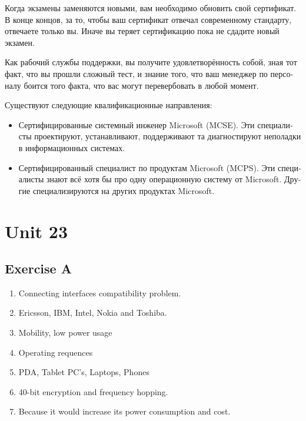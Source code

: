 \documentclass[a5paper,10pt,notitlepage,pdftex,headsepline]{scrartcl}
\begin{document}
\begin{otherlanguage}{russian}
      Когда экзамены заменяются новыми, вам необходимо обновить свой
      сертификат.
      В конце концов, за то, чтобы ваш сертификат отвечал современному
      стандарту, отвечаете только вы.
      Иначе вы теряет сертификацию пока не сдадите новый экзамен.

      Как рабочий службы поддержки, вы получите удовлетворённость собой, зная
      тот факт, что вы прошли сложный тест, и знание того, что ваш менеджер по
      персоналу боится того факта, что вас могут перевербовать в любой момент.

      Существуют следующие квалификационные направления:
      \begin{itemize}
        \item Сертифицированные системный инженер Microsoft (MCSE).
          Эти специалисты проектируют, устанавливают, поддерживают та
          диагностируют неполадки в информационных системах.
        \item Сертифицированный специалист по продуктам Microsoft (MCPS).
          Эти специалисты знают всё хотя бы про одну операционную систему от
          Microsoft.
          Другие специализируются на других продуктах Microsoft.
      \end{itemize}
    \end{otherlanguage}
\section{Unit 23}
  \subsection{Exercise A}
    \begin{enumerate}
      \item Connecting interfaces compatibility problem.
      \item Ericsson, IBM, Intel, Nokia and Toshiba.
      \item Mobility, low power usage
      \item Operating requences
      \item PDA, Tablet PC's, Laptops, Phones
      \item  40-bit encryption and frequency hopping.
      \item Because it would increase its power consumption and cost.
    \end{enumerate}
\end{document}

